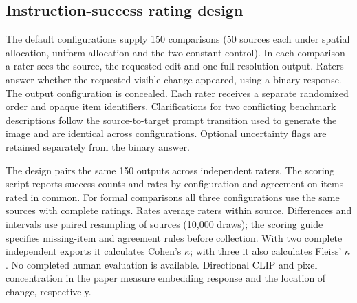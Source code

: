 \subsection{Instruction-success rating design}
The default configurations supply 150 comparisons (50 sources each under spatial allocation, uniform allocation and the two-constant control). In each comparison a rater sees the source, the requested edit and one full-resolution output. Raters answer whether the requested visible change appeared, using a binary response. The output configuration is concealed. Each rater receives a separate randomized order and opaque item identifiers. Clarifications for two conflicting benchmark descriptions follow the source-to-target prompt transition used to generate the image and are identical across configurations. Optional uncertainty flags are retained separately from the binary answer.
 
The design pairs the same 150 outputs across independent raters. The scoring script reports success counts and rates by configuration and agreement on items rated in common. For formal comparisons all three configurations use the same sources with complete ratings. Rates average raters within source. Differences and intervals use paired resampling of sources (10,000 draws); the scoring guide specifies missing-item and agreement rules before collection. With two complete independent exports it calculates Cohen's $\kappa$; with three it also calculates Fleiss' $\kappa$. No completed human evaluation is available. Directional CLIP and pixel concentration in the paper measure embedding response and the location of change, respectively.
